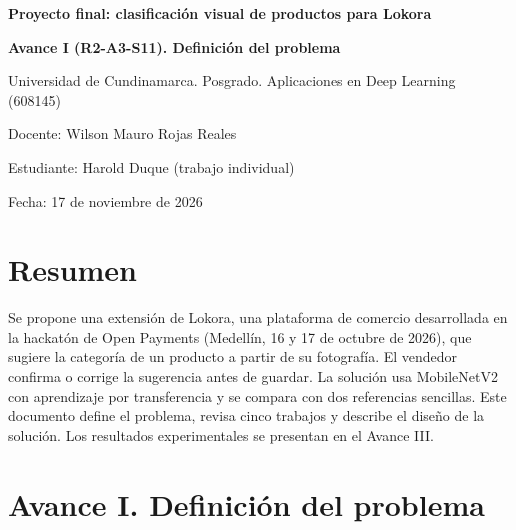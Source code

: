 \documentclass[11pt,a4paper]{article}
\begin{document}
{\LARGE\bfseries Proyecto final: clasificación visual de productos para Lokora\par}\vspace{0.4em}
\noindent \textbf{Avance I (R2-A3-S11). Definición del problema}\par
\noindent Universidad de Cundinamarca. Posgrado. Aplicaciones en Deep Learning (608145)\par
\noindent Docente: Wilson Mauro Rojas Reales\par
\noindent Estudiante: Harold Duque (trabajo individual)\par
\noindent Fecha: 17 de noviembre de 2026\par
\section*{Resumen}
\noindent Se propone una extensión de Lokora, una plataforma de comercio desarrollada en la hackatón de Open Payments (Medellín, 16 y 17 de octubre de 2026), que sugiere la categoría de un producto a partir de su fotografía. El vendedor confirma o corrige la sugerencia antes de guardar. La solución usa MobileNetV2 con aprendizaje por transferencia y se compara con dos referencias sencillas. Este documento define el problema, revisa cinco trabajos y describe el diseño de la solución. Los resultados experimentales se presentan en el Avance III.\par
\section*{Avance I. Definición del problema}
\end{document}
